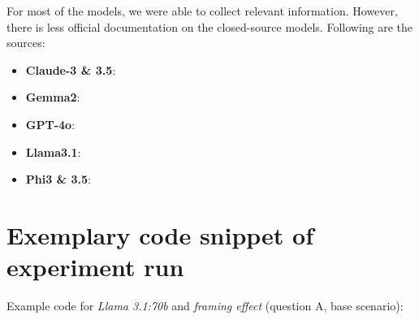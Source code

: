 \par For most of the models, we were able to collect relevant information. However, there is less official documentation on the closed-source models. Following are the sources:
\begin{itemize}
    \item \textbf{Claude-3 \& 3.5}: \textcite{anthropic2024claude, anthropic2024claude2, decoder2024claudeassistant, felloai2024claudeai, neoteric2024claude3_5}
    \item \textbf{Gemma2}: \textcite{team2024gemma}
    \item \textbf{GPT-4o}: \textcite{explodingtopics2024gptparameters, furia2024gpt4o, openai2024gpt4o, openai2024gpt4omini, yub2024gpt4o}
    \item \textbf{Llama3.1}: \textcite{dubey2024llama, huggingface2024llama3_1_8b, meta2024llama31}
    \item \textbf{Phi3 \& 3.5}: \textcite{abdin2024phi, huggingface2024phi3_medium, huggingface2024phi3_5_mini}
\end{itemize}

\newpage
\section{Exemplary code snippet of experiment run}
\label{appendix:example_code}

\par Example code for \textit{Llama 3.1:70b} and \textit{framing effect} (question A, base scenario):


\lstset{style=GitHubStyle}

